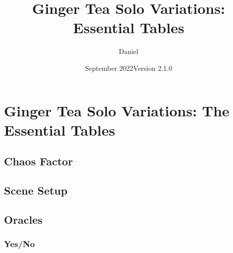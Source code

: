 

\title{Ginger Tea Solo Variations: Essential Tables}
\date{September 2022\newline{}Version 2.1.0}
\author{Daniel}


\mainmatter
\section{Ginger Tea Solo Variations: The Essential Tables}

\subsection{Chaos Factor}


\subsection{Scene Setup}




\newpage
\subsection{Oracles}
\subsubsection{Yes/No}



